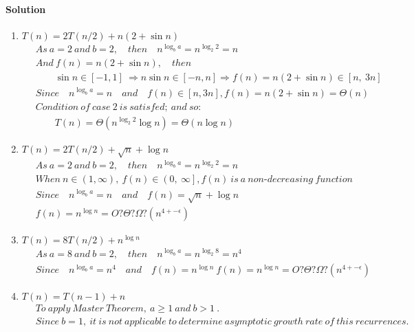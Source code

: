 \documentclass[a4paper]{scrartcl}
\begin{document}
\paragraph{Solution}
\begin{enumerate}[label=(\alph*)]
  \item $T (n) = 2T (n/2) + n(2 + \sin{n})$
\begin{align*}
  &\ As\ a = 2\ and\ b = 2,\quad then \quad n^{\log_b{a}} = n^{\log_2{2}} = n\\
  &\ And\ f(n) = n(2 + \sin{n}),\quad then\\ &\
  \qquad \sin{n} \in \left[-1, 1\right]\ \Rightarrow n\sin{n} \in \left[-n, n\right] \Rightarrow f(n) = n\left(2 + \sin{n}\right) \in \left[n,\ 3n\right]\\ &\
  Since\quad n^{\log_b{a}} = n \quad and \quad f(n) \in \left[n,3n\right], f(n) = n(2 + \sin{n}) = \Theta(n)\\ &\
  Condition\ of\ case\ 2\ is\ satisfed;\ and\ so:\\
  &\ \qquad T(n)=\Theta\left({n^{\log_2{2}}\log{n}}\right) =\Theta\left({n\log{n}}\right)
\end{align*}
\item $T (n) = 2T (n/2) + \sqrt{n} + \log{n}$
\begin{align*}
  &\ As\ a = 2\ and\ b = 2,\quad then \quad n^{\log_b{a}} = n^{\log_2{2}} = n\\
  &\ When\ n \in \left(1, \infty\right),\ f(n) \in \left(0,\ \infty\right], f(n)\ is\ a\ non\text{-}decreasing\ function\\ &\
  Since\quad n^{\log_b{a}} = n \quad and \quad f(n) = \sqrt{n} + \log{n}\\ &\
  f(n) = n^{\log{n}} = O? \Theta ? \Omega ? (n^{4+-\epsilon})
\end{align*}
\item $T (n) = 8T (n/2) + n^{\log{n}}$
\begin{align*}
  &\ As\ a = 8\ and\ b = 2,\quad then \quad n^{\log_b{a}} = n^{\log_2{8}} = n^4\\ &\
  Since\quad n^{\log_b{a}} = n^4 \quad and \quad f(n) = n^{\log{n}}\ f(n) = n^{\log{n}} = O? \Theta ? \Omega ? (n^{4+-\epsilon})
\end{align*}
\item $T (n) = T (n - 1) + n$
\begin{align*}
  &\ To\ apply\ Master\ Theorem,\ a \geq 1\ and\ b > 1\ .\\
  &\ Since\ b = 1,\ it\ is\ not\ applicable\ to\ determine\ asymptotic\ growth\ rate\ of\ this\ recurrences.
\end{align*}
\end{enumerate}
\end{document}
